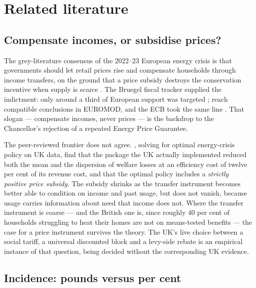 \section{Related literature}
\label{sec:literature}

\subsection{Compensate incomes, or subsidise prices?}

The grey-literature consensus of the 2022--23 European energy crisis is that governments should let retail prices rise and compensate households through income transfers, on the ground that a price subsidy destroys the conservation incentive when supply is scarce \citep{ari2022}. The Bruegel fiscal tracker supplied the indictment: only around a third of European support was targeted \citep{sgaravatti2023}; \citet{amores2023} reach compatible conclusions in EUROMOD, and the ECB took the same line \citep{ecb2023}. That slogan --- compensate incomes, never prices --- is the backdrop to the Chancellor's rejection of a repeated Energy Price Guarantee.

The peer-reviewed frontier does not agree. \citet{levell2025}, solving for optimal energy-crisis policy on UK data, find that the package the UK actually implemented reduced both the mean and the dispersion of welfare losses at an efficiency cost of twelve per cent of its revenue cost, and that the optimal policy includes a \emph{strictly positive price subsidy}. The subsidy shrinks as the transfer instrument becomes better able to condition on income and past usage, but does not vanish, because usage carries information about need that income does not. Where the transfer instrument is coarse --- and the British one is, since roughly 40 per cent of households struggling to heat their homes are not on means-tested benefits \citep{jrf2026} --- the case for a price instrument survives the theory. The UK's live choice between a social tariff, a universal discounted block \citep{jrf2026} and a levy-side rebate \citep{ippr2026} is an empirical instance of that question, being decided without the corresponding UK evidence.

\subsection{Incidence: pounds versus per cent}

